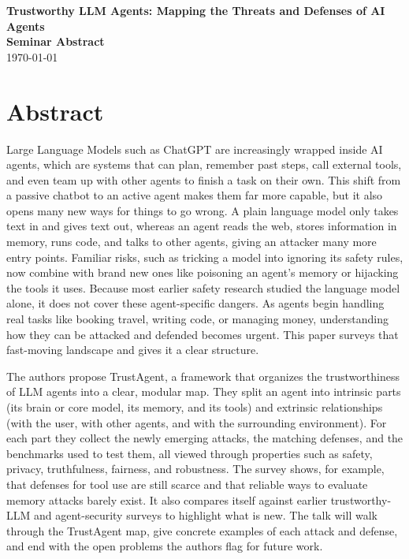 \documentclass[12pt]{article}
\newcommand{\seminardate}{\today}
\begin{document}
\begin{center}
  {\LARGE\bfseries Trustworthy LLM Agents: Mapping the Threats and Defenses of AI Agents}\\[8pt]
  {\large\bfseries Seminar Abstract}\\[6pt]
  {\normalsize \seminardate}
\end{center}
\vspace{1.5em}

\section*{Abstract}
Large Language Models such as ChatGPT are increasingly wrapped inside AI agents, which are systems that can plan, remember past steps, call external tools, and even team up with other agents to finish a task on their own. This shift from a passive chatbot to an active agent makes them far more capable, but it also opens many new ways for things to go wrong. A plain language model only takes text in and gives text out, whereas an agent reads the web, stores information in memory, runs code, and talks to other agents, giving an attacker many more entry points. Familiar risks, such as tricking a model into ignoring its safety rules, now combine with brand new ones like poisoning an agent's memory or hijacking the tools it uses. Because most earlier safety research studied the language model alone, it does not cover these agent-specific dangers. As agents begin handling real tasks like booking travel, writing code, or managing money, understanding how they can be attacked and defended becomes urgent. This paper surveys that fast-moving landscape and gives it a clear structure.

The authors propose TrustAgent, a framework that organizes the trustworthiness of LLM agents into a clear, modular map. They split an agent into intrinsic parts (its brain or core model, its memory, and its tools) and extrinsic relationships (with the user, with other agents, and with the surrounding environment). For each part they collect the newly emerging attacks, the matching defenses, and the benchmarks used to test them, all viewed through properties such as safety, privacy, truthfulness, fairness, and robustness. The survey shows, for example, that defenses for tool use are still scarce and that reliable ways to evaluate memory attacks barely exist. It also compares itself against earlier trustworthy-LLM and agent-security surveys to highlight what is new. The talk will walk through the TrustAgent map, give concrete examples of each attack and defense, and end with the open problems the authors flag for future work.
\end{document}

